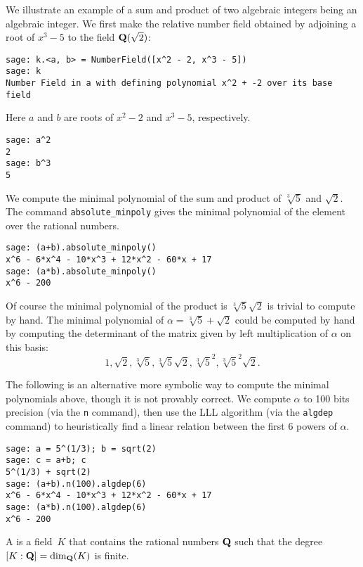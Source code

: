 \begin{example}
  We illustrate an example of a sum and product of two algebraic
  integers being an algebraic integer.  We first make the relative number
  field obtained by adjoining a root of $x^3 - 5$ to the field
  $\mathbf{Q}(\sqrt{2})$:
\begin{verbatim}
sage: k.<a, b> = NumberField([x^2 - 2, x^3 - 5])
sage: k
Number Field in a with defining polynomial x^2 + -2 over its base field
\end{verbatim}%

\noindent Here $a$ and $b$ are roots of $x^2-2$ and $x^3-5$, respectively.
\begin{verbatim}
sage: a^2
2
sage: b^3
5
\end{verbatim}%

\noindent We compute the minimal polynomial of the sum and product of
$\sqrt[3]{5}$ and $\sqrt{2}$.  The command {\tt absolute\_minpoly}
gives the minimal polynomial of the element over the rational numbers.
\begin{verbatim}
sage: (a+b).absolute_minpoly()
x^6 - 6*x^4 - 10*x^3 + 12*x^2 - 60*x + 17
sage: (a*b).absolute_minpoly()
x^6 - 200
\end{verbatim}
Of course the minimal polynomial of the product is $\sqrt[3]{5}
\sqrt{2}$ is trivial to compute by hand.  The minimal polynomial of
$\alpha = \sqrt[3]{5} + \sqrt{2}$ could be computed by hand by
computing the determinant of the matrix given by left multiplication
of $\alpha$ on this basis:
$$
 1,\sqrt{2}, \sqrt[3]{5}, \sqrt[3]{5}\sqrt{2}, \sqrt[3]{5}^2, \sqrt[3]{5}^2\sqrt{2}.
$$

The following is an alternative more symbolic way to compute the
minimal polynomials above, though it is not provably correct.  We
compute $\alpha$ to 100 bits precision (via the {\tt n} command), then
use the LLL algorithm (via the {\tt algdep} command) to heuristically
find a linear relation between the first $6$ powers of $\alpha$.
\begin{verbatim}
sage: a = 5^(1/3); b = sqrt(2)
sage: c = a+b; c
5^(1/3) + sqrt(2)
sage: (a+b).n(100).algdep(6)
x^6 - 6*x^4 - 10*x^3 + 12*x^2 - 60*x + 17
sage: (a*b).n(100).algdep(6)
x^6 - 200
\end{verbatim}
\end{example}

\begin{definition}
  A  is a field~$K$ that contains the rational
  numbers $\mathbf{Q}$ such that the degree $[K:\mathbf{Q}] = \dim_{\mathbf{Q}}(K)$ is finite.
\end{definition}

